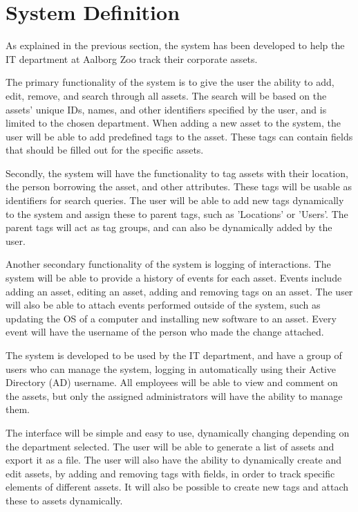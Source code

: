 \section{System Definition}
As explained in the previous section, the system has been developed to help the IT department at Aalborg Zoo track their corporate assets.
\par
The primary functionality of the system is to give the user the ability to add, edit, remove, and search through all assets. The search will be based on the assets' unique IDs, names, and other identifiers specified by the user, and is limited to the chosen department. When adding a new asset to the system, the user will be able to add predefined tags to the asset. These tags can contain fields that should be filled out for the specific assets.
\par
Secondly, the system will have the functionality to tag assets with their location, the person borrowing the asset, and other attributes. These tags will be usable as identifiers for search queries. The user will be able to add new tags dynamically to the system and assign these to parent tags, such as 'Locations' or 'Users'. The parent tags will act as tag groups, and can also be dynamically added by the user. 
\par
Another secondary functionality of the system is logging of interactions. The system will be able to provide a history of events for each asset. Events include adding an asset, editing an asset, adding and removing tags on an asset. The user will also be able to attach events performed outside of the system, such as updating the OS of a computer and installing new software to an asset. Every event will have the username of the person who made the change attached.
\par
The system is developed to be used by the IT department, and have a group of users who can manage the system, logging in automatically using their Active Directory (AD) username. All employees will be able to view and comment on the assets, but only the assigned administrators will have the ability to manage them. 
\par
The interface will be simple and easy to use, dynamically changing depending on the department selected. The user will be able to generate a list of assets and export it as a file. The user will also have the ability to dynamically create and edit assets, by adding and removing tags with fields, in order to track specific elements of different assets. It will also be possible to create new tags and attach these to assets dynamically.
